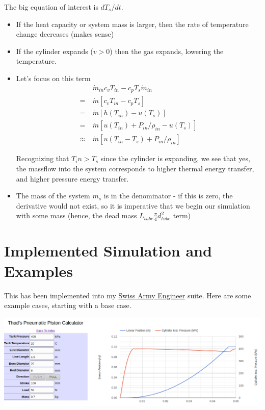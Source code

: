 \documentclass[10pt,letterpaper]{article}
\begin{document}
	The big equation of interest is $dT_s/dt$.
	\begin{itemize}
		\item If the heat capacity or system mass is larger, then the rate of temperature change decreases (makes sense)
		\item If the cylinder expands ($v > 0$) then the gas expands, lowering the temperature.
		\item Let's focus on this term
			\begin{align}
				  & \dot{m}_{in} c_v T_{in} - c_p T_s \dot{m}_{in} \nonumber \\
				=\ & \dot{m} [c_v T_{in} - c_p T_s] \nonumber \\
				=\ & \dot{m} [h(T_{in}) - u(T_s)] \nonumber \\
				=\ & \dot{m} [u(T_{in}) + P_{in} / \rho_{in} - u(T_s)] \nonumber \\
				\approx \ & \dot{m} [u(T_{in}-T_s) + P_{in} / \rho_{in}] \nonumber
			\end{align}
			
			Recognizing that $T_in > T_s$ since the cylinder is expanding, we see that yes, the massflow into the system corresponds to higher thermal energy transfer, and higher pressure energy transfer.
		\item The mass of the system $m_s$ is in the denominator - if this is zero, the derivative would not exist, so it is imperative that we begin our simulation with some mass (hence, the dead mass $L_{tube} \frac{\pi}{4} d_{tube}^2$ term)
	\end{itemize}
	
	\section*{Implemented Simulation and Examples}
	
	This has been implemented into my \href{http://thaddeus-maximus.github.io/swissarmyengineer/}{Swiss Army Engineer} suite. Here are some example cases, starting with a base case.
	
	\includegraphics[width=\textwidth]{pneu_case_1.png}
	
\end{document}

